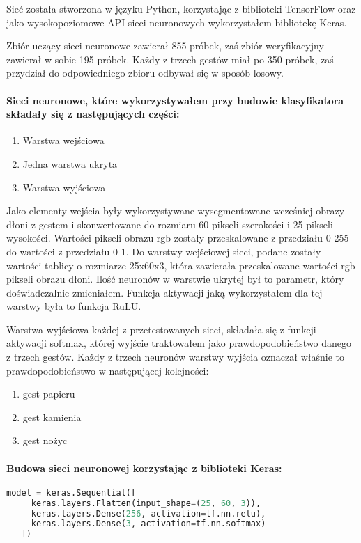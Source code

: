 \documentclass[a4paper,12pt,twoside,openany]{report}
\begin{document}
	Sieć została stworzona w języku Python, korzystając z biblioteki TensorFlow oraz jako wysokopoziomowe API sieci neuronowych wykorzystałem bibliotekę Keras.

	Zbiór uczący sieci neuronowe zawierał 855 próbek, zaś zbiór weryfikacyjny zawierał w sobie 195 próbek. Każdy z trzech gestów miał po 350 próbek, zaś przydział do odpowiedniego zbioru odbywał się w sposób losowy.
	
	\paragraph{Sieci neuronowe, które wykorzystywałem przy budowie klasyfikatora składały się z następujących części:}
	\begin{enumerate}
		\item Warstwa wejściowa
		\item Jedna warstwa ukryta
		\item Warstwa wyjściowa
	\end{enumerate}
	
	Jako elementy wejścia były wykorzystywane wysegmentowane wcześniej obrazy dłoni z gestem i skonwertowane do rozmiaru 60 pikseli szerokości i 25 pikseli wysokości. Wartości pikseli obrazu rgb zostały przeskalowane z przedziału 0-255 do wartości z przedziału 0-1. 
	Do warstwy wejściowej sieci, podane zostały wartości tablicy o rozmiarze 25x60x3, która zawierała przeskalowane wartości rgb pikseli obrazu dłoni.
	Ilość neuronów w warstwie ukrytej był to parametr, który doświadczalnie zmieniałem. Funkcja aktywacji jaką wykorzystałem dla tej warstwy była to funkcja RuLU.

	Warstwa wyjściowa każdej z przetestowanych sieci, składała się z funkcji aktywacji softmax, której wyjście traktowałem jako prawdopodobieństwo danego z trzech gestów. Każdy z trzech neuronów warstwy wyjścia oznaczał właśnie to prawdopodobieństwo w następującej kolejności:
	\begin{enumerate}
		\item gest papieru
		\item gest kamienia
		\item gest nożyc
	\end{enumerate}

	\paragraph{Budowa sieci neuronowej korzystając z biblioteki Keras:}
	\begin{lstlisting}[language=Python]
   model = keras.Sequential([
     keras.layers.Flatten(input_shape=(25, 60, 3)),
     keras.layers.Dense(256, activation=tf.nn.relu),
     keras.layers.Dense(3, activation=tf.nn.softmax)
   ])
	\end{lstlisting}
	
\end{document}
